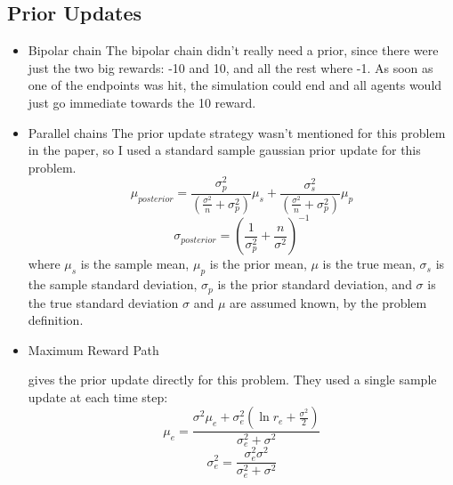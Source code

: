 \documentclass{article}
\begin{document}
\subsection{Prior Updates}

  \begin{itemize}
  \item Bipolar chain
  The bipolar chain didn't really need a prior, since there were just the two big rewards: -10 and 10, and all the rest where -1. As soon as one of the endpoints was hit, the simulation could end and all agents would just go immediate towards the 10 reward.
  
  \item Parallel chains
 The prior update strategy wasn't mentioned for this problem in the paper, so  I used a standard sample gaussian prior update for this problem.
 $$\mu_{posterior} = \frac{\sigma_p^2}{(\frac{\sigma^2}{n} + \sigma_p^2)} \mu_s + \frac{\sigma_s^2}{(\frac{\sigma^2}{n} + \sigma_p^2)} \mu_p$$
 $$\sigma_{posterior} = ( \frac{1}{\sigma_p^2} + \frac{n}{\sigma^2})^{-1}$$
 where $\mu_s$ is the sample mean, $\mu_p$ is the prior mean, $\mu$ is the true mean, $\sigma_s$ is the sample standard deviation, $\sigma_p$ is the prior standard deviation, and $\sigma$ is the true standard deviation $\sigma$ and $\mu$ are assumed known, by the problem definition.
  
  \item Maximum Reward Path
  
  \cite{SeedSampling} gives the prior update directly for this problem. They used a single sample update at each time step:
  $$\mu_e = \frac{\sigma^2 \mu_e + \sigma_e^2(\ln{r_e} + \frac{\sigma^2}{2}) }{\sigma_e^2+\sigma^2}$$
  $$\sigma_e^2 = \frac{\sigma_e^2 \sigma^2}{\sigma_e^2 + \sigma^2}$$
  \end{itemize}
\end{document}
